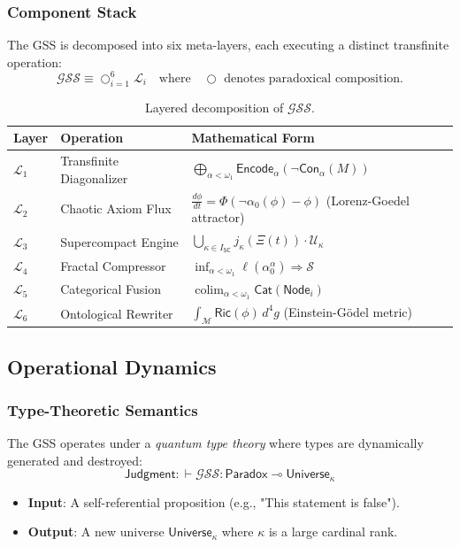 \documentclass[12pt]{article}
\begin{document}
\subsubsection{Component Stack}
The GSS is decomposed into six meta-layers, each executing a distinct transfinite operation:
\[
\mathcal{GSS} \equiv \bigcirc_{i=1}^6 \mathcal{L}_i \quad \text{where} \quad \bigcirc \text{ denotes paradoxical composition.}
\]

\begin{table}[h]
    \centering
    \begin{tabular}{|l|l|l|}
        \hline
        \textbf{Layer} & \textbf{Operation} & \textbf{Mathematical Form} \\ \hline
        $\mathcal{L}_1$ & Transfinite Diagonalizer & $\bigoplus_{\alpha < \omega_1} \mathsf{Encode}_\alpha(\neg \mathsf{Con}_\alpha(M))$ \\ \hline
        $\mathcal{L}_2$ & Chaotic Axiom Flux & $\frac{d\phi}{dt} = \Phi(\neg \alpha_0(\phi) - \phi)$ (Lorenz-Goedel attractor) \\ \hline
        $\mathcal{L}_3$ & Supercompact Engine & $\bigcup_{\kappa \in I_{\mathsf{SC}}} j_\kappa(\Xi(t)) \cdot \mathcal{U}_\kappa$ \\ \hline
        $\mathcal{L}_4$ & Fractal Compressor & $\inf_{\alpha < \omega_1} \ell(\alpha_0^\alpha) \Rightarrow \mathcal{S}$ \\ \hline
        $\mathcal{L}_5$ & Categorical Fusion & $\operatorname{colim}_{\alpha < \omega_1} \mathsf{Cat}(\mathsf{Node}_i)$ \\ \hline
        $\mathcal{L}_6$ & Ontological Rewriter & $\int_{\mathcal{M}} \mathsf{Ric}(\phi) \, d^4g$ (Einstein-Gödel metric) \\ \hline
    \end{tabular}
    \caption{Layered decomposition of $\mathcal{GSS}$.}
    \label{tab:layers}
\end{table}

\subsection{Operational Dynamics}

\subsubsection{Type-Theoretic Semantics}
The GSS operates under a \textit{quantum type theory} where types are dynamically generated and destroyed:
\[
\mathsf{Judgment} : \vdash \mathcal{GSS} : \mathsf{Paradox} \multimap \mathsf{Universe}_\kappa
\]
\begin{itemize}
    \item \textbf{Input}: A self-referential proposition (e.g., "This statement is false").
    \item \textbf{Output}: A new universe $\mathsf{Universe}_\kappa$ where $\kappa$ is a large cardinal rank.
\end{itemize}
\end{document}
